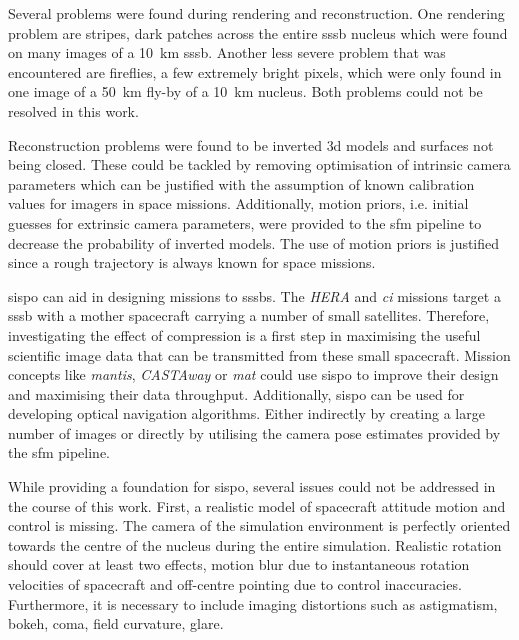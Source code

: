 Several problems were found during rendering and reconstruction. One rendering problem are stripes, dark patches across the entire \gls{sssb} nucleus which were found on many images of a \SI{10}{\kilo\meter} \gls{sssb}. Another less severe problem that was encountered are  fireflies, a few extremely bright pixels, which were only found in one image of a \SI{50}{\kilo\meter} fly-by of a \SI{10}{\kilo\meter} nucleus. Both problems could not be resolved in this work.

Reconstruction problems were found to be inverted \gls{3d} models and surfaces not being closed. These could be tackled by removing optimisation of intrinsic camera parameters which can be justified with the assumption of known calibration values for imagers in space missions. Additionally, motion priors, i.e. initial guesses for extrinsic camera parameters, were provided to the \gls{sfm} pipeline to decrease the probability of inverted models. The use of motion priors is justified since a rough trajectory is always known for space missions.

\Gls{sispo} can aid in designing missions to \glspl{sssb}. The \textit{HERA} and \textit{\gls{ci}} missions target a \gls{sssb} with a mother spacecraft carrying a number of small satellites. Therefore, investigating the effect of compression is a first step in maximising the useful scientific image data that can be transmitted from these small spacecraft. Mission concepts like \textit{\gls{mantis}}, \textit{CASTAway} or \textit{\gls{mat}} could use \gls{sispo} to improve their design and maximising their data throughput. Additionally, \gls{sispo} can be used for developing optical navigation algorithms. Either indirectly by creating a large number of images or directly by utilising the camera pose estimates provided by the \gls{sfm} pipeline.

While providing a foundation for \gls{sispo}, several issues could not be addressed in the course of this work. First, a realistic model of spacecraft attitude motion and control is missing. The camera of the simulation environment is perfectly oriented towards the centre of the nucleus during the entire simulation. Realistic rotation should cover at least two effects, motion blur due to instantaneous rotation velocities of spacecraft and off-centre pointing due to control inaccuracies. Furthermore, it is necessary to include imaging distortions such as astigmatism, bokeh, coma, field curvature, glare.

